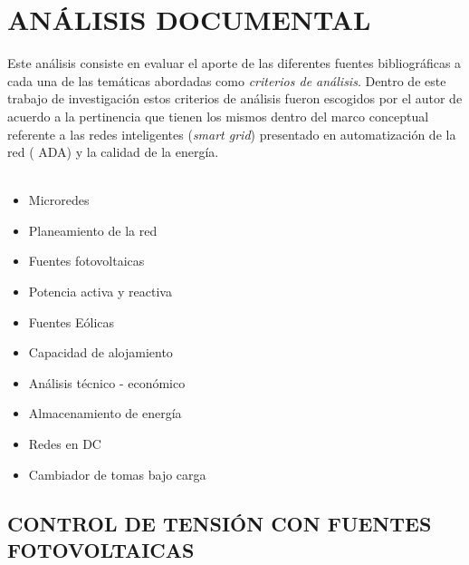 \documentclass[12pt, letterpaper]{report}
\begin{document}

\chapter{ANÁLISIS DOCUMENTAL}
\label{cap:documental}

Este  análisis  consiste en evaluar el aporte de las diferentes fuentes bibliográficas a cada una de las temáticas abordadas  como \textit{criterios de análisis}. Dentro de este trabajo de investigación estos criterios de análisis fueron escogidos por el autor de acuerdo a la pertinencia que tienen los mismos dentro del marco conceptual referente a las redes inteligentes (\textit{smart grid}) presentado en   automatización de la red ( \ac{ADA}) y la calidad de la energía.\\\\ 

 \begin{itemize} 
    \item Microredes
    \item Planeamiento de la red
    \item Fuentes fotovoltaicas
    \item Potencia activa y reactiva
    \item Fuentes Eólicas
    \item Capacidad de alojamiento
    \item Análisis técnico - económico
    \item Almacenamiento de energía
    \item Redes en DC
    \item Cambiador de tomas bajo carga
 \end{itemize} 

\section{CONTROL DE TENSIÓN CON FUENTES FOTOVOLTAICAS}
\end{document}
